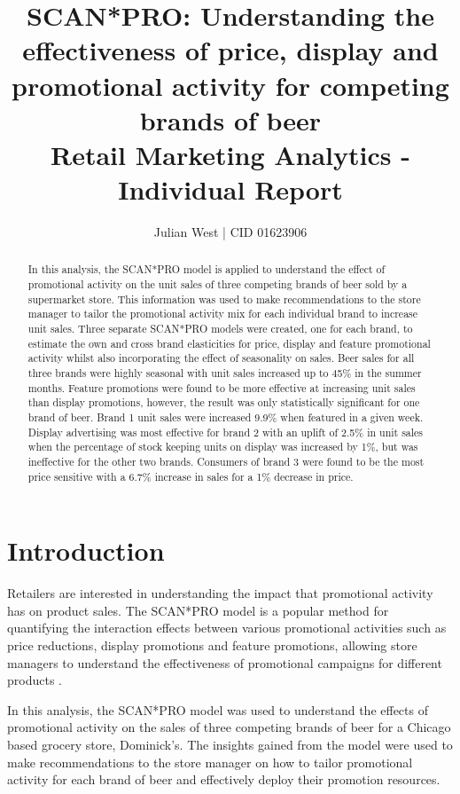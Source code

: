 \documentclass[a4paper,11pt]{article}
\title{SCAN*PRO: Understanding the effectiveness of price, display and promotional activity for competing brands of beer  \\
\addlinespace
\large Retail Marketing Analytics - Individual Report}
\author{Julian West | CID 01623906}
\begin{document}
\maketitle
\begin{abstract}
In this analysis, the SCAN*PRO model is applied to understand the effect of promotional activity on the unit sales of three competing brands of beer sold by a supermarket store. This information was used to make recommendations to the store manager to tailor the promotional activity mix for each individual brand to increase unit sales. Three separate SCAN*PRO models were created, one for each brand, to estimate the own and cross brand elasticities for price, display and feature promotional activity whilst also incorporating the effect of seasonality on sales. Beer sales for all three brands were highly seasonal with unit sales increased up to 45\% in the summer months. Feature promotions were found to be more effective at increasing unit sales than display promotions, however, the result was only statistically significant for one brand of beer. Brand 1 unit sales were increased 9.9\% when featured in a given week. Display advertising was most effective for brand 2 with an uplift of 2.5\% in unit sales when the percentage of stock keeping units on display was increased by 1\%, but was ineffective for the other two brands. Consumers of brand 3 were found to be the most price sensitive with a 6.7\% increase in sales for a 1\% decrease in price. 

\end{abstract} \hspace{50pt}

\newpage
\tableofcontents
\newpage

\section{Introduction}
Retailers are interested in understanding the impact that promotional activity has on product sales. The SCAN*PRO model \citep{wittink_estimation_1988} is a popular method for quantifying the interaction effects between various promotional activities such as price reductions, display promotions and feature promotions, allowing store managers to understand the effectiveness of promotional campaigns for different products \citep{andrews_estimating_2008, srinivasan_promotions_2004}. 

In this analysis, the SCAN*PRO model was used to understand the effects of promotional activity on the sales of three competing brands of beer for a Chicago based grocery store, Dominick's. The insights gained from the model were used to make recommendations to the store manager on how to tailor promotional activity for each brand of beer and effectively deploy their promotion resources.
\end{document}
